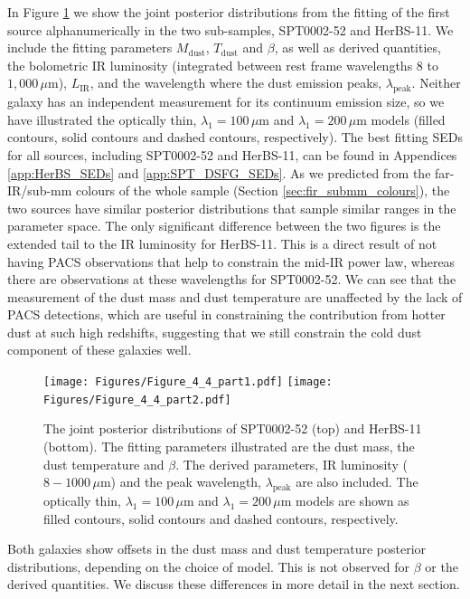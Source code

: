 In Figure \ref{fig:example_SEDs} we show the joint posterior distributions from the fitting of the first source alphanumerically in the two sub-samples, SPT0002-52 and HerBS-11. We include the fitting parameters $M_{\textrm{dust}}$, $T_{\textrm{dust}}$ and $\beta$, as well as derived quantities, the bolometric IR luminosity (integrated between rest frame wavelengths $8$ to $1,000\,\mu$m), $L_\textrm{IR}$, and the wavelength where the dust emission peaks, $\lambda_\textrm{peak}$. Neither galaxy has an independent measurement for its continuum emission size, so we have illustrated the optically thin, $\lambda_1 = 100\,\mu$m and $\lambda_1 = 200\,\mu$m models (filled contours, solid contours and dashed contours, respectively). The best fitting SEDs for all sources, including SPT0002-52 and HerBS-11, can be found in Appendices \ref{app:HerBS_SEDs} and \ref{app:SPT_DSFG_SEDs}. As we predicted from the far-IR/sub-mm colours of the whole sample (Section \ref{sec:fir_submm_colours}), the two sources have similar posterior distributions that sample similar ranges in the parameter space. The only significant difference between the two figures is the extended tail to the IR luminosity for HerBS-11. This is a direct result of not having PACS observations that help to constrain the mid-IR power law, whereas there are observations at these wavelengths for SPT0002-52. We can see that the measurement of the dust mass and dust temperature are unaffected by the lack of PACS detections, which are useful in constraining the contribution from hotter dust at such high redshifts, suggesting that we still constrain the cold dust component of these galaxies well. 

\begin{figure}
	\centering
	\texttt{[image: Figures/Figure\_4\_4\_part1.pdf]}
	\texttt{[image: Figures/Figure\_4\_4\_part2.pdf]}
	\caption[Posterior distributions for SPT0002-52 and HerBS-11]{The joint posterior distributions of SPT0002-52 (top) and HerBS-11 (bottom). The fitting parameters illustrated are the dust mass, the dust temperature and $\beta$. The derived parameters, IR luminosity ($8 - 1000\,\mu$m) and the peak wavelength, $\lambda_\textrm{peak}$ are also included. The optically thin, $\lambda_1 = 100\,\mu$m and $\lambda_1 = 200\,\mu$m models are shown as filled contours, solid contours and dashed contours, respectively.}
	\label{fig:example_SEDs}
\end{figure}

Both galaxies show offsets in the dust mass and dust temperature posterior distributions, depending on the choice of model. This is not observed for $\beta$ or the derived quantities. We discuss these differences in more detail in the next section.

